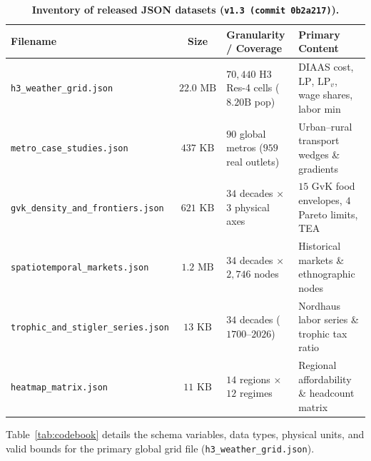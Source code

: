 \documentclass[11pt,a4paper]{article}
\begin{document}
\begin{table}[htbp]
\centering
\caption{\textbf{Inventory of released JSON datasets (\texttt{v1.3 (commit 0b2a217)}).}}
\label{tab:inventory}
\small
\begin{tabular}{lcll}
\toprule
\textbf{Filename} & \textbf{Size} & \textbf{Granularity / Coverage} & \textbf{Primary Content} \\
\midrule
\texttt{h3\_weather\_grid.json} & $22.0\text{ MB}$ & $70{,}440$ H3 Res-4 cells ($8.20\text{B}$ pop) & DIAAS cost, $\text{LP}$, $\text{LP}_v$, wage shares, labor min \\
\texttt{metro\_case\_studies.json} & $437\text{ KB}$ & $90$ global metros ($959$ real outlets) & Urban--rural transport wedges \& gradients \\
\texttt{gvk\_density\_and\_frontiers.json} & $621\text{ KB}$ & $34$ decades $\times$ $3$ physical axes & $15$ GvK food envelopes, $4$ Pareto limits, TEA \\
\texttt{spatiotemporal\_markets.json} & $1.2\text{ MB}$ & $34$ decades $\times$ $2{,}746$ nodes & Historical markets \& ethnographic nodes \\
\texttt{trophic\_and\_stigler\_series.json} & $13\text{ KB}$ & $34$ decades ($1700\text{--}2026$) & Nordhaus labor series \& trophic tax ratio \\
\texttt{heatmap\_matrix.json} & $11\text{ KB}$ & $14$ regions $\times$ $12$ regimes & Regional affordability \& headcount matrix \\
\bottomrule
\end{tabular}
\end{table}

Table~\ref{tab:codebook} details the schema variables, data types, physical units, and valid bounds for the primary global grid file (\texttt{h3\_weather\_grid.json}).
\end{document}
